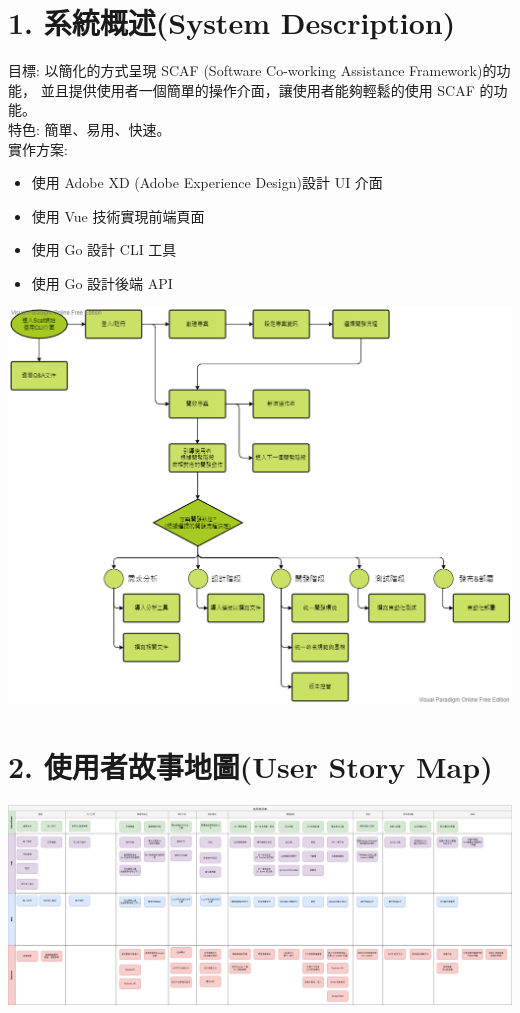 \documentclass{report}
\begin{document}
\section*{1. 系統概述(System Description)}
目標: 以簡化的方式呈現 SCAF (Software Co-working Assistance Framework)的功能，
並且提供使用者一個簡單的操作介面，讓使用者能夠輕鬆的使用 SCAF 的功能。\\
特色: 簡單、易用、快速。\\
實作方案:
  \begin{itemize}
    \item 使用 Adobe XD (Adobe Experience Design)設計 UI 介面
    \item 使用 Vue 技術實現前端頁面
    \item 使用 Go 設計 CLI 工具
    \item 使用 Go 設計後端 API
  \end{itemize}
\includegraphics[width=\textwidth]{assets/system.png}

\section*{2. 使用者故事地圖(User Story Map)}

\includegraphics[width=\textwidth]{assets/User_Story_Map.png}
\end{document}
